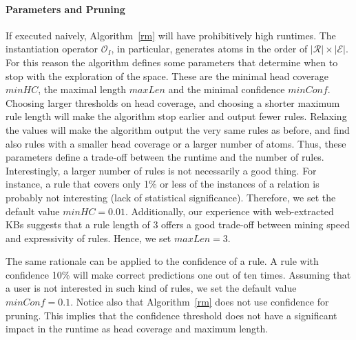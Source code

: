 \paragraph{Parameters and Pruning} 
If executed naively, Algorithm~\ref{rm} will have prohibitively high runtimes.
The instantiation operator $\mathcal{O}_I$, in particular, generates atoms in the order of $|\mathcal{R}| \times |\mathcal{E}|$.
For this reason the algorithm defines some parameters that determine when to stop with the exploration of the space. 
These are the minimal head coverage $minHC$, the maximal length $maxLen$ and the minimal confidence $minConf$.
Choosing larger thresholds on head coverage, and choosing a shorter maximum rule length will make the algorithm stop earlier 
and output fewer rules. Relaxing the values will make the algorithm output the very same rules as before, 
and find also rules with a smaller head coverage or a larger number of atoms. 
Thus, these parameters define a trade-off between the runtime and the number of rules. 
Interestingly, a larger number of rules is not necessarily a good thing. 
For instance, a rule that covers only 1\% or less of the instances of a relation is probably not interesting 
(lack of statistical significance). Therefore, we set the default value $minHC=0.01$. 
Additionally, our experience with web-extracted KBs suggests that a rule length of 3 offers a good trade-off 
between mining speed and expressivity of rules. Hence, we set $maxLen=3$.

The same rationale can be applied to the confidence of a rule. A rule with confidence 10\% will make correct predictions one out of
ten times. Assuming that a user is not interested in such kind of rules, we set the default value $minConf=0.1$. 
Notice also that Algorithm~\ref{rm} does not use confidence for pruning. This implies that the confidence
threshold does not have a significant impact in the runtime as head coverage and maximum length.

